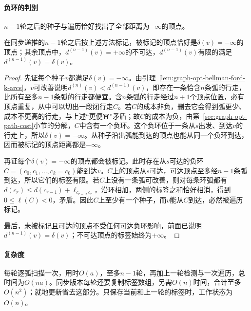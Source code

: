 \paragraph{负环的判别}
$n-1$轮之后的种子与遍历恰好找出了全部距离为$-\infty$的顶点。

\begin{theorem}
\label{thm:graph-opt-bellman-ford-negative-cycles}
在同步递推的$n-1$轮之后按上述方法标记，被标记的顶点恰好是$\delta(v)=-\infty$的顶点；其余顶点中，$d^{(n-1)}(v)=+\infty$的不可达，$d^{(n-1)}(v)$有限的满足$d^{(n-1)}(v)=\delta(v)$。
\end{theorem}

\begin{proof}
先证每个种子$v$都满足$\delta(v)=-\infty$。由引理~\ref{lem:graph-opt-bellman-ford-k-arcs}，$v$可改善说明$d^{(n)}(v)<d^{(n-1)}(v)$，即存在一条恰含$n$条弧的行走，比所有至多$n-1$条弧的行走都便宜。含$n$条弧的行走经过$n+1$个顶点位置，必有顶点重复，从中可以切出一段闭行走$C$。若$C$的成本非负，删去它会得到弧更少、成本不更高的行走，与上述“更便宜”矛盾；故$C$的成本为负，由第~\ref{sec:graph-opt-path-cost}小节的分解，$C$中含有一个负环。这个负环位于一条从$s$出发、到达$v$的行走上，所以$\delta(v)=-\infty$。从种子沿出弧能到达的顶点也能从同一个负环到达，因而被标记的顶点距离都是$-\infty$。

再证每个$\delta(v)=-\infty$的顶点都会被标记。此时存在从$s$可达的负环$C=(c_0,c_1,\ldots,c_k=c_0)$能到达$v$。$C$上的顶点从$s$可达，可达顶点至多经$n-1$条弧到达，所以它们的标签有限。若$C$上没有一条弧可改善，则对每条环弧都有$d(c_{r})\leq d(c_{r-1})+\ell_{c_{r-1},c_r}$，沿环相加，两侧的标签之和恰好相消，得到$0\leq\ell(C)<0$，矛盾。因此$C$上至少有一个种子，而$v$能从$C$到达，必然被遍历标记。

最后，未被标记且可达的顶点不受任何可达负环影响，前面已说明$d^{(n-1)}(v)=\delta(v)$；不可达顶点的标签始终为$+\infty$。
\end{proof}

\paragraph{复杂度}
每轮逐弧扫描一次，用时$O(a)$，至多$n-1$轮，再加上一轮检测与一次遍历，总时间为$O(na)$。同步版本每轮还要复制标签数组，另需$O(n)$时间，合计至多$O(n^2)$；就地更新省去这部分。只保存当前和上一轮的标签时，工作状态为$O(n)$。

